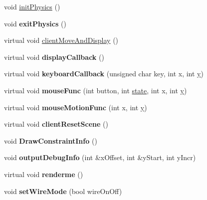 \begin{DoxyCompactItemize}
\item 
void \hyperlink{class_basic_demo3_d_ad5a13b49ba40ef5b7c2a1e4c4ef8f6ce}{init\+Physics} ()
\item 
\hypertarget{class_basic_demo3_d_a1484f82959f686e4710b96c532bc4ab3}{void {\bfseries exit\+Physics} ()}\label{class_basic_demo3_d_a1484f82959f686e4710b96c532bc4ab3}

\item 
virtual void \hyperlink{class_basic_demo3_d_a503a97c9c9248ff1d4169b2a901ea510}{client\+Move\+And\+Display} ()
\item 
\hypertarget{class_basic_demo3_d_a44b9e3c5b1402830bd1a2677be1eae68}{virtual void {\bfseries display\+Callback} ()}\label{class_basic_demo3_d_a44b9e3c5b1402830bd1a2677be1eae68}

\item 
\hypertarget{class_basic_demo3_d_a5126f46aa85ec93eff1040d2c0394158}{virtual void {\bfseries keyboard\+Callback} (unsigned char key, int x, int \hyperlink{_ice_utils_8h_aa7ffaed69623192258fb8679569ff9ba}{y})}\label{class_basic_demo3_d_a5126f46aa85ec93eff1040d2c0394158}

\item 
\hypertarget{class_basic_demo3_d_aaee831ee0b9115a5113d215f604ebdd7}{virtual void {\bfseries mouse\+Func} (int button, int \hyperlink{structstate}{state}, int x, int \hyperlink{_ice_utils_8h_aa7ffaed69623192258fb8679569ff9ba}{y})}\label{class_basic_demo3_d_aaee831ee0b9115a5113d215f604ebdd7}

\item 
\hypertarget{class_basic_demo3_d_a537152077c7a22db9cc856b296d89daf}{virtual void {\bfseries mouse\+Motion\+Func} (int x, int \hyperlink{_ice_utils_8h_aa7ffaed69623192258fb8679569ff9ba}{y})}\label{class_basic_demo3_d_a537152077c7a22db9cc856b296d89daf}

\item 
\hypertarget{class_basic_demo3_d_a32e5df7ddc856c5bc672f3f315580dbb}{virtual void {\bfseries client\+Reset\+Scene} ()}\label{class_basic_demo3_d_a32e5df7ddc856c5bc672f3f315580dbb}

\item 
\hypertarget{class_basic_demo3_d_a271fd3bbc899de1c65137f7c2f119ca3}{void {\bfseries Draw\+Constraint\+Info} ()}\label{class_basic_demo3_d_a271fd3bbc899de1c65137f7c2f119ca3}

\item 
\hypertarget{class_basic_demo3_d_ae96fbab684f639c0fd2b9b26a50a2904}{void {\bfseries output\+Debug\+Info} (int \&x\+Offset, int \&y\+Start, int y\+Incr)}\label{class_basic_demo3_d_ae96fbab684f639c0fd2b9b26a50a2904}

\item 
\hypertarget{class_basic_demo3_d_a186165f8bdee712cef62062e426ecb88}{virtual void {\bfseries renderme} ()}\label{class_basic_demo3_d_a186165f8bdee712cef62062e426ecb88}

\item 
\hypertarget{class_basic_demo3_d_a6cce1226b5285122e3a7539bb21a0761}{void {\bfseries set\+Wire\+Mode} (bool wire\+On\+Off)}\label{class_basic_demo3_d_a6cce1226b5285122e3a7539bb21a0761}

\end{DoxyCompactItemize}
